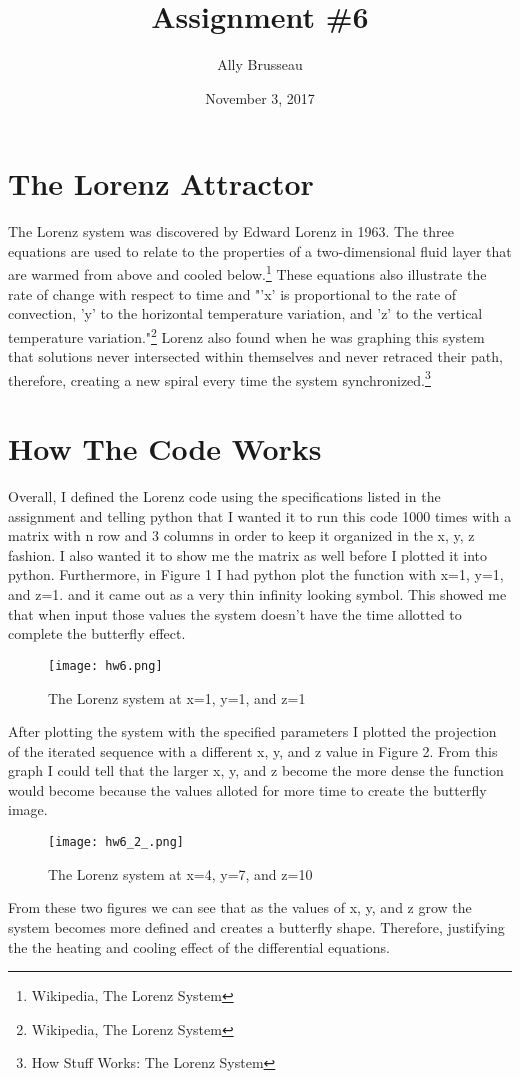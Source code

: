 \documentclass{article}[10]
\title{Assignment \#6}
\author{Ally Brusseau}
\date{November 3, 2017}
\begin{document}
\maketitle

\section*{The Lorenz Attractor}
The Lorenz system was discovered by Edward Lorenz in 1963. The three equations are used to relate to the properties of a two-dimensional fluid layer that are warmed from above and cooled below.\footnote{Wikipedia, The Lorenz System} These equations also illustrate the rate of change with respect to time and "'x' is proportional to the rate of convection, 'y' to the horizontal temperature variation, and 'z' to the vertical temperature variation."\footnote{Wikipedia, The Lorenz System} Lorenz also found when he was graphing this system that solutions never intersected within themselves and never retraced their path, therefore, creating a new spiral every time the system synchronized.\footnote{How Stuff Works: The Lorenz System}

\section*{How The Code Works}

Overall, I defined the Lorenz code using the specifications listed in the assignment and telling python that I wanted it to run this code 1000 times with a matrix with n row and 3 columns in order to keep it organized in the x, y, z fashion. I also wanted it to show me the matrix as well before I plotted it into python. Furthermore, in Figure 1 I had python plot the function with x=1, y=1, and z=1. and it came out as a very thin infinity looking symbol. This showed me that when input those values the system doesn't have the time allotted to complete the butterfly effect.

\begin{figure}[h]
\center 
\caption{The Lorenz system at x=1, y=1, and z=1}
\texttt{[image: hw6.png]}
\end{figure}

After plotting the system with the specified parameters I plotted the projection of the iterated sequence with a different x, y, and z value in Figure 2. From this graph I could tell that the larger x, y, and z become the more dense the function would become because the values alloted for more time to create the butterfly image.

\begin{figure}[h]
\center 
\caption{The Lorenz system at x=4, y=7, and z=10}
\texttt{[image: hw6\_2\_.png]}
\end{figure}

From these two figures we can see that as the values of x, y, and z grow the system becomes more defined and creates a butterfly shape. Therefore, justifying the the heating and cooling effect of the differential equations.
\end{document}
